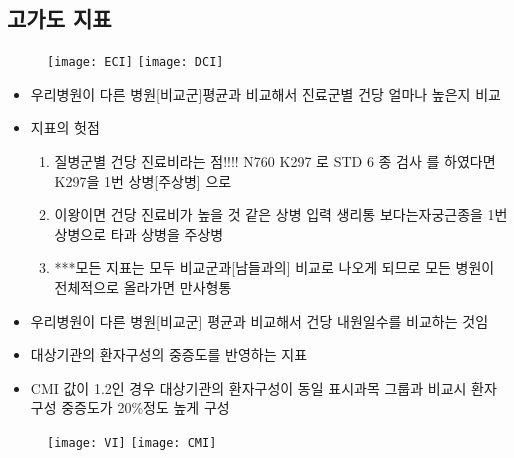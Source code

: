 \subsection{고가도 지표}
\begin{figure}
\centering
  \centering
  \texttt{[image: ECI]}
  \centering
  \texttt{[image: DCI]}
\end{figure}
\begin{itemize}\tightlist
\item 우리병원이 다른 병원[비교군]평균과 비교해서 진료군별 건당 얼마나 높은지 비교
\item 지표의 헛점
	\begin{enumerate}[1.]\tightlist
	\item 질병군별 건당 진료비라는 점!!!! N760 K297 로  STD 6 종 검사 를 하였다면 K297을 1번 상병[주상병] 으로
	\item 이왕이면 건당 진료비가 높을 것 같은 상병 입력 생리통 보다는자궁근종을 1번 상병으로 타과 상병을 주상병
	\item ***모든 지표는 모두 비교군과[남들과의] 비교로 나오게 되므로 모든 병원이 전체적으로 올라가면 만사형통
	\end{enumerate}
\end{itemize}
\begin{itemize}\tightlist
\item 우리병원이 다른 병원[비교군] 평균과 비교해서 건당 내원일수를 비교하는 것임
\end{itemize}
\begin{itemize}\tightlist
\item 대상기관의 환자구성의 중증도를 반영하는 지표
\item CMI 값이 1.2인 경우 대상기관의 환자구성이 동일 표시과목 그룹과 비교시 환자 구성 중증도가 20\%정도 높게 구성
\end{itemize}

\begin{figure}
\centering
  \centering
  \texttt{[image: VI]}
  \centering
  \texttt{[image: CMI]}
\end{figure}
